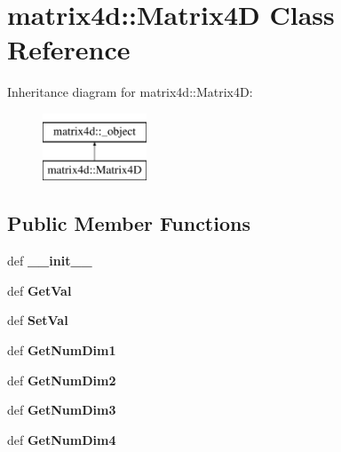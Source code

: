 \hypertarget{classmatrix4d_1_1Matrix4D}{
\section{matrix4d::Matrix4D Class Reference}
\label{d8/d2d/classmatrix4d_1_1Matrix4D}
}
Inheritance diagram for matrix4d::Matrix4D:\begin{figure}[H]
\begin{center}
\leavevmode
\includegraphics[height=2cm]{d8/d2d/classmatrix4d_1_1Matrix4D}
\end{center}
\end{figure}
\subsection*{Public Member Functions}
\begin{DoxyCompactItemize}
\item 
\hypertarget{classmatrix4d_1_1Matrix4D_aa8d774229c413810f9b45e3f9639e14a}{
def {\bfseries \_\-\_\-init\_\-\_\-}}
\label{d8/d2d/classmatrix4d_1_1Matrix4D_aa8d774229c413810f9b45e3f9639e14a}

\item 
\hypertarget{classmatrix4d_1_1Matrix4D_a6fafbf238ef7c28349d531f83fd8cf33}{
def {\bfseries GetVal}}
\label{d8/d2d/classmatrix4d_1_1Matrix4D_a6fafbf238ef7c28349d531f83fd8cf33}

\item 
\hypertarget{classmatrix4d_1_1Matrix4D_a2b5889d9f828b99718de148fca1be9f9}{
def {\bfseries SetVal}}
\label{d8/d2d/classmatrix4d_1_1Matrix4D_a2b5889d9f828b99718de148fca1be9f9}

\item 
\hypertarget{classmatrix4d_1_1Matrix4D_a3f9d959c9d4c8d5320747d7ee04c9fec}{
def {\bfseries GetNumDim1}}
\label{d8/d2d/classmatrix4d_1_1Matrix4D_a3f9d959c9d4c8d5320747d7ee04c9fec}

\item 
\hypertarget{classmatrix4d_1_1Matrix4D_a95aa43f9651d99efa51c414cbde29838}{
def {\bfseries GetNumDim2}}
\label{d8/d2d/classmatrix4d_1_1Matrix4D_a95aa43f9651d99efa51c414cbde29838}

\item 
\hypertarget{classmatrix4d_1_1Matrix4D_af60a9f91fa2c528f76bea466db63dd12}{
def {\bfseries GetNumDim3}}
\label{d8/d2d/classmatrix4d_1_1Matrix4D_af60a9f91fa2c528f76bea466db63dd12}

\item 
\hypertarget{classmatrix4d_1_1Matrix4D_ad1da489a0f84e1092e77a7586c03a062}{
def {\bfseries GetNumDim4}}
\label{d8/d2d/classmatrix4d_1_1Matrix4D_ad1da489a0f84e1092e77a7586c03a062}

\end{DoxyCompactItemize}
